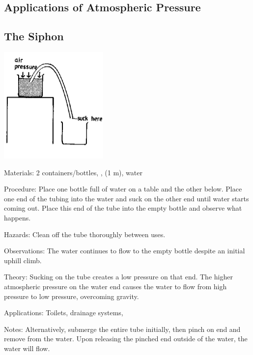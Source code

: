\begin{multicols}{2}
\columnbreak


\section*{Applications of Atmospheric Pressure}


\subsection{The Siphon} 

\begin{center}
\includegraphics[width=0.4\textwidth]{./img/source/siphon.png}
\end{center}

\begin{description*}
\item[Materials:]{2 containers/bottles, , (1 m), water}
\item[Procedure:]{Place one bottle full of water on a table and the other below. Place one end of the tubing into the water and suck on the other end until water starts coming out. Place this end of the tube into the empty bottle and observe what happens.}
\item[Hazards:]{Clean off the tube thoroughly between uses.}
\item[Observations:]{The water continues to flow to the empty bottle despite an initial uphill climb.}
\item[Theory:]{Sucking on the tube creates a low pressure on that end. The higher atmospheric pressure on the water end causes the water to flow from high pressure to low pressure, overcoming gravity.}
\item[Applications:]{Toilets, drainage systems, }
\item[Notes:]{Alternatively, submerge the entire tube initially, then pinch on end and remove from the water. Upon releasing the pinched end outside of the water, the water will flow.}
\end{description*}


\end{multicols}
